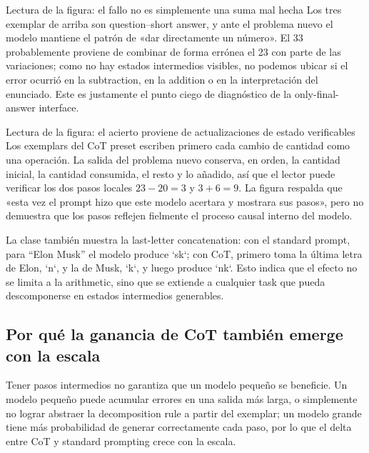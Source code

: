 
\begin{knowledgebox}{Lectura de la figura: el fallo no es simplemente una suma mal hecha}
Los tres exemplar de arriba son question--short answer, y ante el problema nuevo el modelo mantiene el patrón de «dar directamente un número». El 33 probablemente proviene de combinar de forma errónea el 23 con parte de las variaciones; como no hay estados intermedios visibles, no podemos ubicar si el error ocurrió en la subtraction, en la addition o en la interpretación del enunciado. Este es justamente el punto ciego de diagnóstico de la only-final-answer interface.
\end{knowledgebox}


\begin{knowledgebox}{Lectura de la figura: el acierto proviene de actualizaciones de estado verificables}
Los exemplars del CoT preset escriben primero cada cambio de cantidad como una operación. La salida del problema nuevo conserva, en orden, la cantidad inicial, la cantidad consumida, el resto y lo añadido, así que el lector puede verificar los dos pasos locales $23-20=3$ y $3+6=9$. La figura respalda que «esta vez el prompt hizo que este modelo acertara y mostrara sus pasos», pero no demuestra que los pasos reflejen fielmente el proceso causal interno del modelo.
\end{knowledgebox}

La clase también muestra la last-letter concatenation: con el standard prompt, para ``Elon Musk'' el modelo produce `sk`; con CoT, primero toma la última letra de Elon, `n`, y la de Musk, `k`, y luego produce `nk`. Esto indica que el efecto no se limita a la arithmetic, sino que se extiende a cualquier task que pueda descomponerse en estados intermedios generables.

\subsection{Por qué la ganancia de CoT también emerge con la escala}

Tener pasos intermedios no garantiza que un modelo pequeño se beneficie. Un modelo pequeño puede acumular errores en una salida más larga, o simplemente no lograr abstraer la decomposition rule a partir del exemplar; un modelo grande tiene más probabilidad de generar correctamente cada paso, por lo que el delta entre CoT y standard prompting crece con la escala.

